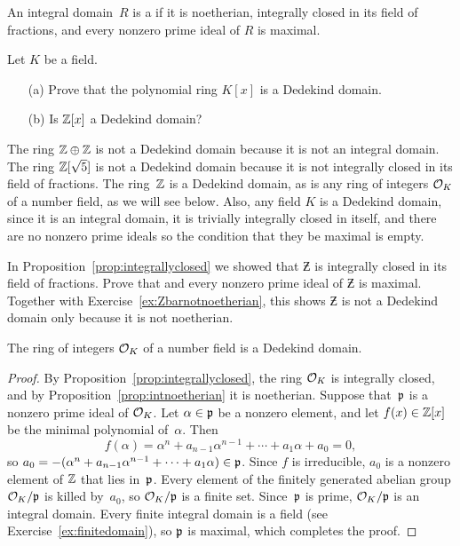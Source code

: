 \begin{definition}
An integral domain~$R$ is a  if it is noetherian,
integrally closed in its field of fractions, and every nonzero prime
ideal of $R$ is maximal.
\end{definition}

\begin{exercise}
Let $K$ be a field.
\begin{enumerate}
\item[(a)] Prove that the polynomial ring $K[x]$ is a Dedekind domain.
\item[(b)] Is $\mathbb{Z}[x]$ a Dedekind domain?
\end{enumerate}
\end{exercise}

The ring $\mathbb{Z}\oplus \mathbb{Z}$ is not a Dedekind domain because it is not an
integral domain.  The ring $\mathbb{Z}[\sqrt{5}]$ is not a Dedekind domain
because it is not integrally closed in its field of fractions.  The
ring~$\mathbb{Z}$ is a Dedekind domain, as is any ring of integers $\mathcal{O}_K$ of a
number field, as we will see below.  Also, any field $K$ is a Dedekind
domain, since it is an integral domain, it is trivially integrally
closed in itself, and there are no nonzero prime ideals so the
condition that they be maximal is empty.

\begin{exercise}
	In Proposition~\ref{prop:integrallyclosed} we showed
	that $\Zbar$ is integrally closed in its field of fractions.
	Prove that and every nonzero prime ideal of $\Zbar$
	is maximal. Together with Exercise~\ref{ex:Zbarnotnoetherian},
	this shows $\Zbar$ is not a Dedekind domain only because it
	is not noetherian.
\end{exercise}

\begin{proposition}
The ring of integers $\mathcal{O}_K$ of a number field is a Dedekind domain.
\end{proposition}
\begin{proof}
By Proposition~\ref{prop:integrallyclosed}, the ring $\mathcal{O}_K$ is
integrally closed, and by Proposition~\ref{prop:intnoetherian} it is
noetherian.  Suppose that~$\mathfrak{p}$ is a nonzero prime ideal of $\mathcal{O}_K$.
Let $\alpha\in \mathfrak{p}$ be a nonzero element, and let $f(x)\in\mathbb{Z}[x]$ be the
minimal polynomial of~$\alpha$.  Then
$$f(\alpha)=\alpha^n+a_{n-1}\alpha^{n-1}+\cdots+a_1\alpha+a_0=0,$$ so
$a_0 = -(\alpha^n+a_{n-1}\alpha^{n-1}+\cdots+a_1\alpha)\in \mathfrak{p}$.  Since
$f$ is irreducible, $a_0$ is a nonzero element of $\mathbb{Z}$ that lies
in~$\mathfrak{p}$.  Every element of the finitely generated abelian group
$\mathcal{O}_K/\mathfrak{p}$ is killed by~$a_0$, so $\mathcal{O}_K/\mathfrak{p}$ is a finite set.
Since~$\mathfrak{p}$ is prime, $\mathcal{O}_K/\mathfrak{p}$ is an integral domain.  Every finite
integral domain is a field (see Exercise~\ref{ex:finitedomain}), so
$\mathfrak{p}$ is maximal, which completes the proof.
\end{proof}

